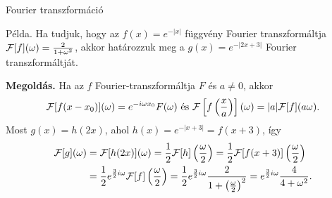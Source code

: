 \documentclass[table]{beamer}
\begin{document}

\begin{frame}
Mivel $f(x)=g\left( x-\frac 52\right)$, ez\'ert 
\begin{align*}
{\cal F}[f](\omega)&={\cal F}\left[ g\left( x-\frac 52\right)\right](\omega) =
e^{ -\frac 52 i\omega} \frac {2}{\omega}\sin\left( \frac{\omega}{2}\right)\\
&=\left( \cos\frac{5\omega}{2}-i\sin\frac{5\omega}{2}\right) 
\frac {2}{\omega}\sin\left( \frac{\omega}{2}\right).
\end{align*}

\vskip .5cm
\begin{exampleblock}{2. feladat}
Határozzuk meg a következő függvény Fourier transzformáltját!
\[
f(x)=\begin{cases}
-1,&\mbox{ha }x\in[-1,0]\\
1,&\mbox{ha }x\in]0,1]\\
0,&\mbox{egyébként.}
\end{cases}
\]
\end{exampleblock}
\end{frame}

\begin{frame}[fragile]
{Fourier transzformáció}
\begin{exampleblock}{P\'elda.}
Ha tudjuk, hogy az $f(x)=e^{-|x|}$ f\"uggv\'eny Fourier transzform\'altja 
${\cal F}[f](\omega)=\frac{2}{1+\omega^2}$, akkor hat\'arozzuk meg a $g(x)=e^{-|2x+3|}$ 
Fourier transzform\'altj\'at. 
\end{exampleblock}
{\bf Megold\'as.} Ha az $f$ Fourier-transzform\'altja $F$ \'es $a\ne 0$, akkor 
\[
{\cal F}[f(x-x_0)](\omega)=e^{-i\omega x_0}F(\omega) \text{ \'es }
{\cal F}\left[ f\left(\frac xa\right)\right] (\omega)=|a|{\cal F}[f](a\omega). 
\]
Most $g(x)=h(2x)$, ahol $h(x)=e^{-|x+3|}=f(x+3)$, \'igy 
\begin{align*}
{\cal F}[g](\omega)&={\cal F}[h(2x)](\omega)=\frac 12{\cal F}[h]\left(\frac{\omega}{2}\right)
=\frac 12{\cal F}[f(x+3)]\left(\frac{\omega}{2}\right)\\
&=\frac 12 e^{\frac 32 i\omega}{\cal F}[f]\left(\frac{\omega}{2}\right)=\frac 12 e^{\frac 32 i\omega}
\frac{2}{1+\left(\frac{\omega}{2}\right)^2}=e^{\frac 32 i\omega}\frac{4}{4+\omega^2}.
\end{align*}
\end{frame}
\end{document}
